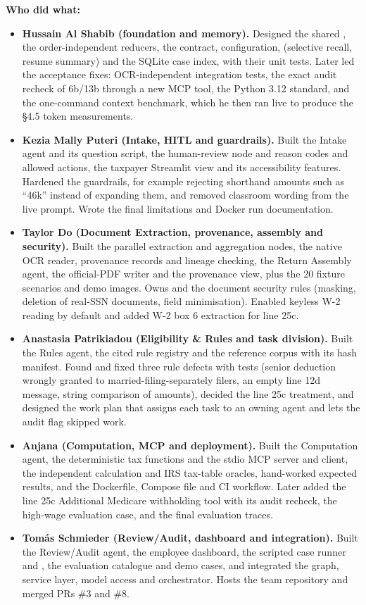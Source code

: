 \documentclass[9pt]{extarticle}
\newcommand{\code}[1]{\texttt{\detokenize{#1}}}
\begin{document}
\textbf{Who did what:}
\begin{itemize}[itemsep=0.15em]
  \item \textbf{Hussain Al Shabib (foundation and memory).} Designed the shared \code{CaseState}, the order-independent reducers, the \code{AgentResult} contract, configuration, \code{memory.py} (selective recall, resume summary) and the SQLite case index, with their unit tests. Later led the acceptance fixes: OCR-independent integration tests, the exact audit recheck of 6b/13b through a new MCP tool, the Python 3.12 standard, and the one-command context benchmark, which he then ran live to produce the \S4.5 token measurements.
  \item \textbf{Kezia Mally Puteri (Intake, HITL and guardrails).} Built the Intake agent and its question script, the human-review node and \code{hitl.py} reason codes and allowed actions, the taxpayer Streamlit view and its accessibility features. Hardened the guardrails, for example rejecting shorthand amounts such as ``46k'' instead of expanding them, and removed classroom wording from the live prompt. Wrote the final limitations and Docker run documentation.
  \item \textbf{Taylor Do (Document Extraction, provenance, assembly and security).} Built the parallel extraction and aggregation nodes, the native OCR reader, provenance records and lineage checking, the Return Assembly agent, the official-PDF writer and the provenance view, plus the 20 fixture scenarios and demo images. Owns \code{ssn.py} and the document security rules (masking, deletion of real-SSN documents, field minimisation). Enabled keyless W-2 reading by default and added W-2 box 6 extraction for line 25c.
  \item \textbf{Anastasia Patrikiadou (Eligibility \& Rules and task division).} Built the Rules agent, the cited rule registry and the reference corpus with its hash manifest. Found and fixed three rule defects with tests (senior deduction wrongly granted to married-filing-separately filers, an empty line 12d message, string comparison of amounts), decided the line 25c treatment, and designed the work plan that assigns each task to an owning agent and lets the audit flag skipped work.
  \item \textbf{Anjana (Computation, MCP and deployment).} Built the Computation agent, the deterministic tax functions and the stdio MCP server and client, the independent calculation and IRS tax-table oracles, hand-worked expected results, and the Dockerfile, Compose file and CI workflow. Later added the line 25c Additional Medicare withholding tool with its audit recheck, the high-wage evaluation case, and the final evaluation traces.
  \item \textbf{Tom\'as Schmieder (Review/Audit, dashboard and integration).} Built the Review/Audit agent, the employee dashboard, the scripted case runner and \code{run.py}, the evaluation catalogue and demo cases, and integrated the graph, service layer, model access and orchestrator. Hosts the team repository and merged PRs \#3 and \#8.
\end{itemize}
\end{document}
